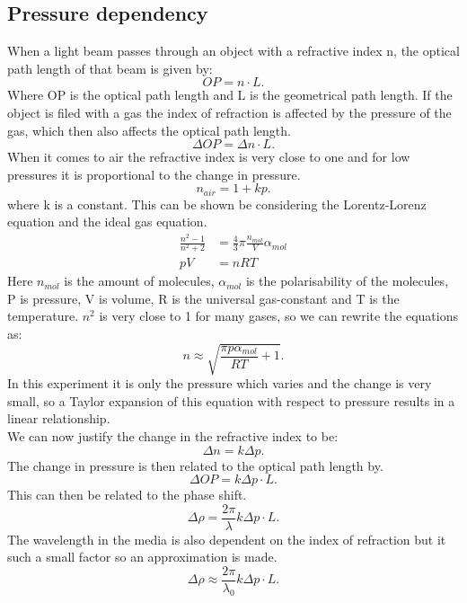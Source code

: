 \documentclass[working, oneside]{inputs/tuftebook}
\begin{document}
\subsection*{Pressure dependency}
When a light beam passes through an object with a refractive index n, the optical path length of that beam is given by:
\[
OP=n \cdot L
.\] 
Where OP is the optical path length and L is the geometrical path length. If the object is filed with a gas the index of refraction is affected by the pressure of the gas, which then also affects the optical path length. 
\[
\Delta OP = \Delta n \cdot L
.\] 
When it comes to air the refractive index is very close to one and for low pressures it is proportional to the change in pressure.
\[
n_{air} = 1 + k p
.\] 
where k is a constant. 
This can be shown be considering the Lorentz-Lorenz equation and the ideal gas equation.
\begin{align*}
\frac{n^2-1}{n^2+2} &=\frac{4}{3}\pi \frac{n_{mol}}{V}\alpha_{mol}
\\
pV &= nRT
\end{align*}
Here $n_{mol}$ is the amount of molecules, $\alpha_{mol}$ is the polarisability of the molecules, P is pressure, V is volume, R is the universal gas-constant and T is the temperature.
$n^2$ is very close to 1 for many gases, so we can rewrite the equations as:
\[
n \approx \sqrt{\frac{\pi p\alpha_{mol}}{RT}+1}
.\] 
In this experiment it is only the pressure which varies and the change is very small, so a Taylor expansion of this equation with respect to pressure results in a linear relationship. \\
We can now justify the change in the refractive index to be:
\[
\Delta n =k\Delta p
.\] 
The change in pressure is then related to the optical path length by.
\[
\Delta OP = k\Delta p\cdot L
.\] 
This can then be related to the phase shift.
\[
\Delta \rho = \frac{2\pi}{\lambda}k\Delta p\cdot L
.\] 
The wavelength in the media is also dependent on the index of refraction but it such a small factor so an approximation is made.
\[
\Delta \rho \approx \frac{2\pi}{\lambda_0}k\Delta p\cdot L
.\] 
\end{document}
